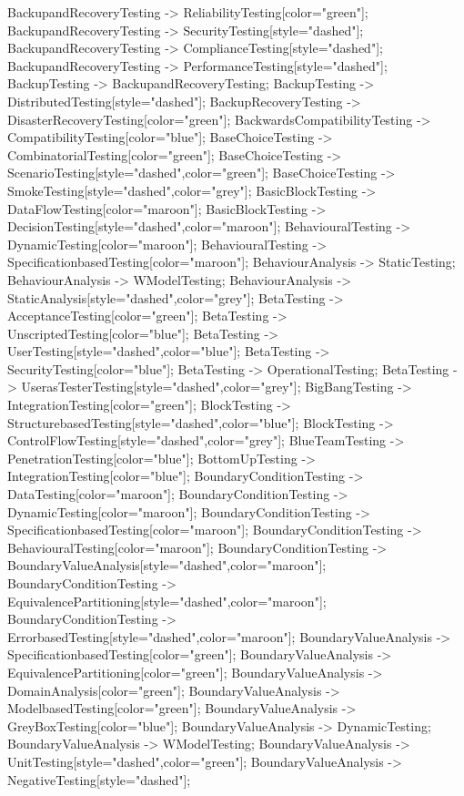 \documentclass{article}
\begin{document}
{BackupandRecoveryTesting -> ReliabilityTesting[color="green"];
BackupandRecoveryTesting -> SecurityTesting[style="dashed"];
BackupandRecoveryTesting -> ComplianceTesting[style="dashed"];
BackupandRecoveryTesting -> PerformanceTesting[style="dashed"];
BackupTesting -> BackupandRecoveryTesting;
BackupTesting -> DistributedTesting[style="dashed"];
BackupRecoveryTesting -> DisasterRecoveryTesting[color="green"];
BackwardsCompatibilityTesting -> CompatibilityTesting[color="blue"];
BaseChoiceTesting -> CombinatorialTesting[color="green"];
BaseChoiceTesting -> ScenarioTesting[style="dashed",color="green"];
BaseChoiceTesting -> SmokeTesting[style="dashed",color="grey"];
BasicBlockTesting -> DataFlowTesting[color="maroon"];
BasicBlockTesting -> DecisionTesting[style="dashed",color="maroon"];
BehaviouralTesting -> DynamicTesting[color="maroon"];
BehaviouralTesting -> SpecificationbasedTesting[color="maroon"];
BehaviourAnalysis -> StaticTesting;
BehaviourAnalysis -> WModelTesting;
BehaviourAnalysis -> StaticAnalysis[style="dashed",color="grey"];
BetaTesting -> AcceptanceTesting[color="green"];
BetaTesting -> UnscriptedTesting[color="blue"];
BetaTesting -> UserTesting[style="dashed",color="blue"];
BetaTesting -> SecurityTesting[color="blue"];
BetaTesting -> OperationalTesting;
BetaTesting -> UserasTesterTesting[style="dashed",color="grey"];
BigBangTesting -> IntegrationTesting[color="green"];
BlockTesting -> StructurebasedTesting[style="dashed",color="blue"];
BlockTesting -> ControlFlowTesting[style="dashed",color="grey"];
BlueTeamTesting -> PenetrationTesting[color="blue"];
BottomUpTesting -> IntegrationTesting[color="blue"];
BoundaryConditionTesting -> DataTesting[color="maroon"];
BoundaryConditionTesting -> DynamicTesting[color="maroon"];
BoundaryConditionTesting -> SpecificationbasedTesting[color="maroon"];
BoundaryConditionTesting -> BehaviouralTesting[color="maroon"];
BoundaryConditionTesting -> BoundaryValueAnalysis[style="dashed",color="maroon"];
BoundaryConditionTesting -> EquivalencePartitioning[style="dashed",color="maroon"];
BoundaryConditionTesting -> ErrorbasedTesting[style="dashed",color="maroon"];
BoundaryValueAnalysis -> SpecificationbasedTesting[color="green"];
BoundaryValueAnalysis -> EquivalencePartitioning[color="green"];
BoundaryValueAnalysis -> DomainAnalysis[color="green"];
BoundaryValueAnalysis -> ModelbasedTesting[color="green"];
BoundaryValueAnalysis -> GreyBoxTesting[color="blue"];
BoundaryValueAnalysis -> DynamicTesting;
BoundaryValueAnalysis -> WModelTesting;
BoundaryValueAnalysis -> UnitTesting[style="dashed",color="green"];
BoundaryValueAnalysis -> NegativeTesting[style="dashed"];
}
\end{document}
